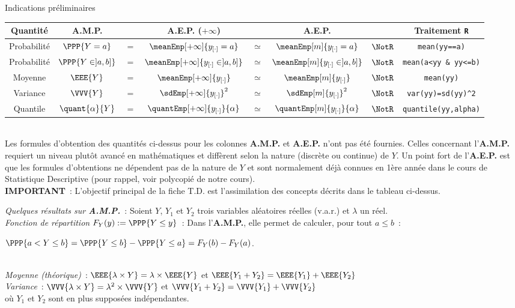 \documentclass[10pt]{report}
\begin{document}
\begin{IndicList}{Indications préliminaires}
\begin{tabular}{|c|ccccccc|}\hline
\textbf{Quantité} & \textbf{A.M.P.}&&\textbf{A.E.P.} ($+\infty$) && \textbf{A.E.P.}  && \textbf{Traitement \texttt{R}} \\\hline\hline
Probabilité \phantom{\rule{1pt}{0.5cm}}& $\PPP{Y = a}$ &$=$& $\meanEmp[+\infty]{y_{[\cdot]}=a}$ &$\simeq$&$\meanEmp[m]{y_{[\cdot]}=a}$ &$\NotR$& \verb!mean(yy==a)! \\
Probabilité \phantom{\rule{1pt}{0.5cm}}& $\PPP{Y \in ]a, b]}$ &$=$& $\meanEmp[+\infty]{y_{[\cdot]}\in ]a, b]}$ &$\simeq$&$\meanEmp[m]{y_{[\cdot]}\in ]a, b]}$ &$\NotR$& \verb!mean(a<yy & yy<=b)! \\
Moyenne & $\EEE{Y}$ &$=$&$\meanEmp[+\infty]{y_{[\cdot]}}$ &$\simeq$&$\meanEmp[m]{y_{[\cdot]}}$ &$\NotR$& \verb!mean(yy)!\\
Variance & $\VVV{Y}$  &$=$& $\sdEmp[+\infty]{y_{[\cdot]}}^2$ &$\simeq$&$\sdEmp[m]{y_{[\cdot]}}^2$ &$\NotR$& \verb!var(yy)=sd(yy)^2!\\
Quantile & $\quant{\alpha}{Y}$ &$=$& $\quantEmp[+\infty]{y_{[\cdot]}}{\alpha}$  &$\simeq$&$\quantEmp[m]{y_{[\cdot]}}{\alpha}$ &$\NotR$& \verb!quantile(yy,alpha)! \\\hline
\end{tabular}
\\[0.2cm]
\noindent Les formules d'obtention des quantités ci-dessus pour les colonnes \textbf{A.M.P.} et \textbf{A.E.P.} n'ont pas été fournies. Celles concernant l'\textbf{A.M.P.} requiert un niveau plutôt avancé en mathématiques et diffèrent selon la nature (discrète ou continue) de $Y$. Un point fort de l'\textbf{A.E.P.} est que les formules d'obtentions  ne dépendent pas de la nature de $Y$ et sont normalement déjà connues en 1ère année dans le cours de Statistique Descriptive (pour rappel, voir polycopié de notre cours).\\
\noindent \textbf{IMPORTANT}~: L'objectif principal de la fiche T.D. est l'assimilation des concepts décrits dans le tableau ci-dessus. 
\item \textit{Quelques résultats sur \textbf{A.M.P.}}~: Soient $Y$, $Y_1$ et $Y_2$ trois variables aléatoires réelles (v.a.r.) et $\lambda$ un réel.\\
  \hspace*{.5cm}\textit{Fonction de répartition $F_Y(y):=\PPP{Y\leq y}$}~: Dans l'\textbf{A.M.P.}, elle permet de calculer,  pour tout $a \leq b$~:\\ 
\centerline{$\PPP{a< Y \leq b} = \PPP{Y\leq b} - \PPP{Y\leq a}=F_Y(b)-F_Y(a)$.}\\
\hspace*{.5cm}\textit{Moyenne (théorique)}~:
$\EEE{\lambda\times Y}=\lambda\times\EEE{Y}$ et $\EEE{Y_1+Y_2}=\EEE{Y_1}+\EEE{Y_2}$\\
\hspace*{.5cm}\textit{Variance}~: $\VVV{\lambda\times Y}=\lambda^2 \times \VVV{Y}$ et 
$\VVV{Y_1+Y_2}=\VVV{Y_1}+\VVV{Y_2}$ \\
\hspace*{.5cm}où $Y_1$ et $Y_2$ sont en plus supposées indépendantes.
\end{IndicList}
\end{document}
